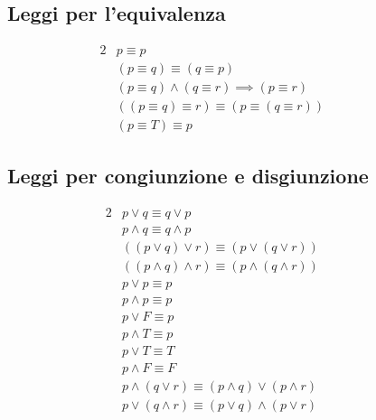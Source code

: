 \documentclass{report}
\newcommand{\AND}{\wedge}
\newcommand{\OR}{\vee}
\begin{document}
    \subsection{Leggi per l'equivalenza}
    \begin{alignat*}{2}
        & p \equiv p                                                \qquad && \tag{riflessivita'} \\
        & (p \equiv q) \equiv (q \equiv p)                          \qquad && \tag{simmetria} \\
        & (p \equiv q) \AND (q \equiv r) \implies (p \equiv r)      \qquad && \tag{transitivita'} \\
        & ((p \equiv q) \equiv r) \equiv (p \equiv (q \equiv r))    \qquad && \tag{associativita'} \\
        & (p \equiv T) \equiv p                                     \qquad && \tag{unita'}
    \end{alignat*}

    \subsection{Leggi per congiunzione e disgiunzione}
    \begin{alignat*}{2}
        & p \OR q \equiv q \OR p                            \qquad && \tag{riflessivita'} \\
        & p \AND q \equiv q \AND p    \\
        & ((p \OR q) \OR r) \equiv (p \OR (q \OR r))        \qquad && \tag{associativita'} \\
        & ((p \AND q) \AND r) \equiv (p \AND (q \AND r)) \\
        & p \OR p \equiv p                                  \qquad && \tag{idempotenza} \\
        & p \AND p \equiv p  \\
        & p \OR F \equiv p                                  \qquad && \tag{unita'} \\
        & p \AND T \equiv p  \\
        & p \OR T \equiv T                                  \qquad && \tag{zero/dominanza} \\
        & p \AND F \equiv F  \\
        & p \AND (q \OR r) \equiv (p \AND q) \OR (p \AND r) \qquad && \tag{distributivita'} \\
        & p \OR (q \AND r) \equiv (p \OR q) \AND (p \OR r) \\
    \end{alignat*}
\end{document}
